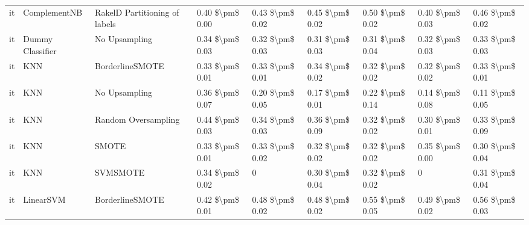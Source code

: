 \begin{tabular}{lllllllll}
      it &                    ComplementNB & RakelD Partitioning of labels & 0.40 \$\textbackslash pm\$ 0.00 &           0.43 \$\textbackslash pm\$ 0.02 &       0.45 \$\textbackslash pm\$ 0.02 &        0.50 \$\textbackslash pm\$ 0.02 &                         0.40 \$\textbackslash pm\$ 0.03 &     0.46 \$\textbackslash pm\$ 0.02 \\
      it &                Dummy Classifier &                 No Upsampling & 0.34 \$\textbackslash pm\$ 0.03 &           0.32 \$\textbackslash pm\$ 0.03 &       0.31 \$\textbackslash pm\$ 0.03 &        0.31 \$\textbackslash pm\$ 0.04 &                         0.32 \$\textbackslash pm\$ 0.03 &     0.33 \$\textbackslash pm\$ 0.03 \\
      it &                             KNN &               BorderlineSMOTE & 0.33 \$\textbackslash pm\$ 0.01 &           0.33 \$\textbackslash pm\$ 0.01 &       0.34 \$\textbackslash pm\$ 0.02 &        0.32 \$\textbackslash pm\$ 0.02 &                         0.32 \$\textbackslash pm\$ 0.02 &     0.33 \$\textbackslash pm\$ 0.01 \\
      it &                             KNN &                 No Upsampling & 0.36 \$\textbackslash pm\$ 0.07 &           0.20 \$\textbackslash pm\$ 0.05 &       0.17 \$\textbackslash pm\$ 0.01 &        0.22 \$\textbackslash pm\$ 0.14 &                         0.14 \$\textbackslash pm\$ 0.08 &     0.11 \$\textbackslash pm\$ 0.05 \\
      it &                             KNN &           Random Oversampling & 0.44 \$\textbackslash pm\$ 0.03 &           0.34 \$\textbackslash pm\$ 0.03 &       0.36 \$\textbackslash pm\$ 0.09 &        0.32 \$\textbackslash pm\$ 0.02 &                         0.30 \$\textbackslash pm\$ 0.01 &     0.33 \$\textbackslash pm\$ 0.09 \\
      it &                             KNN &                         SMOTE & 0.33 \$\textbackslash pm\$ 0.01 &           0.33 \$\textbackslash pm\$ 0.02 &       0.32 \$\textbackslash pm\$ 0.02 &        0.32 \$\textbackslash pm\$ 0.02 &                         0.35 \$\textbackslash pm\$ 0.00 &     0.30 \$\textbackslash pm\$ 0.04 \\
      it &                             KNN &                      SVMSMOTE & 0.34 \$\textbackslash pm\$ 0.02 &                         0 &       0.30 \$\textbackslash pm\$ 0.04 &        0.32 \$\textbackslash pm\$ 0.02 &                                       0 &     0.31 \$\textbackslash pm\$ 0.04 \\
      it &                       LinearSVM &               BorderlineSMOTE & 0.42 \$\textbackslash pm\$ 0.01 &           0.48 \$\textbackslash pm\$ 0.02 &       0.48 \$\textbackslash pm\$ 0.02 &        0.55 \$\textbackslash pm\$ 0.05 &                         0.49 \$\textbackslash pm\$ 0.02 &     0.56 \$\textbackslash pm\$ 0.03 \\

\end{tabular}
